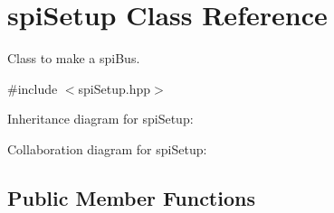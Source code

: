 \hypertarget{classspiSetup}{}\section{spi\+Setup Class Reference}
\label{classspiSetup}


Class to make a spi\+Bus.  




{\ttfamily \#include $<$spi\+Setup.\+hpp$>$}



Inheritance diagram for spi\+Setup\+:


Collaboration diagram for spi\+Setup\+:
\subsection*{Public Member Functions}
